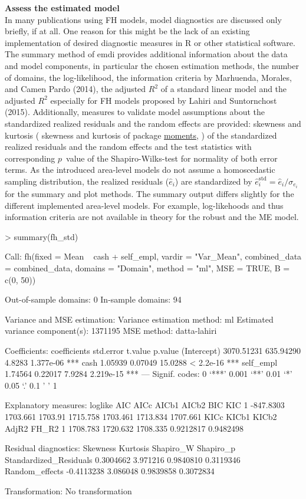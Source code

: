 \textbf{Assess the estimated model}\\
In many publications using FH models, model diagnostics are discussed
only briefly, if at all. One reason for this might be the lack of an
existing implementation of desired diagnostic measures in R or other
statistical software. The summary method of emdi provides additional
information about the data and model components, in particular the
chosen estimation methods, the number of domains, the log-likelihood,
the information criteria by Marhuenda, Morales, and Camen Pardo (2014), the adjusted \(R^2\) of a
standard linear model and the adjusted \(R^2\) especially for FH models
proposed by Lahiri and Suntornchost (2015). Additionally, measures to validate model
assumptions about the standardized realized residuals and the random
effects are provided: skewness and kurtosis ( skewness and kurtosis of
package \href{https://CRAN.R-project.org/package=moments}{moments}, ) of the
standardized realized residuals and the random effects and the test
statistics with corresponding \(p\)~value of the Shapiro-Wilks-test for
normality of both error terms. As the introduced area-level models do
not assume a homoscedastic sampling distribution, the realized residuals
(\(\hat{e}_i\)) are standardized by
\(\hat{e}_i^{\text{std}} = \hat{e}_i / \sigma_{e_{i}}\) for the summary
and plot methods. The summary output differs slightly for the different
implemented area-level models. For example, log-likehoods and thus
information criteria are not available in theory for the robust and the
ME model.

\begin{example}
\textgreater{} summary(fh\_std)

Call: fh(fixed = Mean ~ cash + self\_empl, vardir = "Var\_Mean",
combined\_data = combined\_data, domains = "Domain", method = "ml",
MSE = TRUE, B = c(0, 50))

Out-of-sample domains: 0 In-sample domains: 94

Variance and MSE estimation: Variance estimation method: ml Estimated
variance component(s): 1371195 MSE method: datta-lahiri

Coefficients: coefficients std.error t.value p.value (Intercept)
3070.51231 635.94290 4.8283 1.377e-06 *** cash 1.05939 0.07049
15.0288 \textless{} 2.2e-16 *** self\_empl 1.74564 0.22017 7.9284 2.219e-15
*** --- Signif. codes: 0 `***' 0.001 `**' 0.01 `*' 0.05 `.' 0.1
' ' 1

Explanatory measures: loglike AIC AICc AICb1 AICb2 BIC KIC 1 -847.8303
1703.661 1703.91 1715.758 1703.461 1713.834 1707.661 KICc KICb1 KICb2
AdjR2 FH\_R2 1 1708.783 1720.632 1708.335 0.9212817 0.9482498

Residual diagnostics: Skewness Kurtosis Shapiro\_W Shapiro\_p
Standardized\_Residuals 0.3004662 3.971216 0.9840810 0.3119346
Random\_effects -0.4113238 3.086048 0.9839858 0.3072834

Transformation: No transformation
\end{example}

